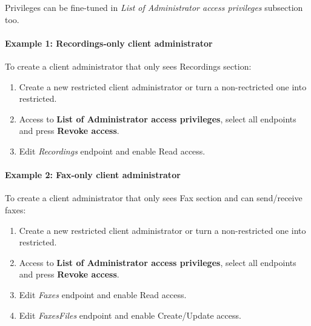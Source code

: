 \documentclass[letterpaper,10pt,english]{sphinxmanual}
\begin{document}
Privileges can be fine-tuned in \emph{List of Administrator access privileges} subsection too.
\paragraph{Example 1: Recordings-only client administrator}

To create a client administrator that only sees Recordings section:
\begin{enumerate}
\item {} 
Create a new restricted client administrator or turn a non-rectricted one into restricted.

\item {} 
Access to \textbf{List of Administrator access privileges}, select all endpoints and press \textbf{Revoke access}.

\item {} 
Edit \emph{Recordings} endpoint and enable Read access.

\end{enumerate}
\paragraph{Example 2: Fax-only client administrator}

To create a client administrator that only sees Fax section and can send/receive faxes:
\begin{enumerate}
\item {} 
Create a new restricted client administrator or turn a non-restricted one into restricted.

\item {} 
Access to \textbf{List of Administrator access privileges}, select all endpoints and press \textbf{Revoke access}.

\item {} 
Edit \emph{Faxes} endpoint and enable Read access.

\item {} 
Edit \emph{FaxesFiles} endpoint and enable Create/Update access.

\end{enumerate}



\renewcommand{\indexname}{Index}
\printindex
\end{document}

